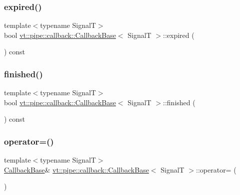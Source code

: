 \subsubsection{\texorpdfstring{expired()}{expired()}}
{\footnotesize\ttfamily template$<$typename SignalT$>$ \\
bool \hyperlink{structvt_1_1pipe_1_1callback_1_1_callback_base}{vt\+::pipe\+::callback\+::\+Callback\+Base}$<$ SignalT $>$\+::expired (\begin{DoxyParamCaption}{ }\end{DoxyParamCaption}) const\hspace{0.3cm}{\ttfamily [inline]}}

\mbox{\label{structvt_1_1pipe_1_1callback_1_1_callback_base_a20ed519d03b62560080ce3bdb8986f03}} 
\subsubsection{\texorpdfstring{finished()}{finished()}}
{\footnotesize\ttfamily template$<$typename SignalT$>$ \\
bool \hyperlink{structvt_1_1pipe_1_1callback_1_1_callback_base}{vt\+::pipe\+::callback\+::\+Callback\+Base}$<$ SignalT $>$\+::finished (\begin{DoxyParamCaption}{ }\end{DoxyParamCaption}) const\hspace{0.3cm}{\ttfamily [inline]}}

\mbox{\label{structvt_1_1pipe_1_1callback_1_1_callback_base_a078375aa25cb0c0e2968804ef3a86a5f}} 
\subsubsection{\texorpdfstring{operator=()}{operator=()}}
{\footnotesize\ttfamily template$<$typename SignalT$>$ \\
\hyperlink{structvt_1_1pipe_1_1callback_1_1_callback_base}{Callback\+Base}\& \hyperlink{structvt_1_1pipe_1_1callback_1_1_callback_base}{vt\+::pipe\+::callback\+::\+Callback\+Base}$<$ SignalT $>$\+::operator= (\begin{DoxyParamCaption}\item[{\hyperlink{structvt_1_1pipe_1_1callback_1_1_callback_base}{Callback\+Base}$<$ SignalT $>$ const \&}]{ }\end{DoxyParamCaption})\hspace{0.3cm}{\ttfamily [default]}}


